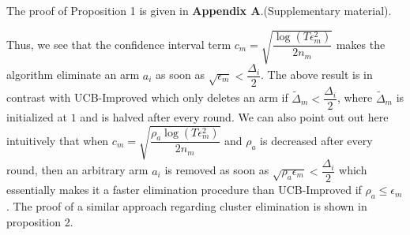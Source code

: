 	The proof of Proposition 1 is given in \textbf{Appendix A}.(Supplementary material).

\begin{remark}
\label{Result:Rem:10}	
	Thus, we see that the confidence interval term $c_{m}=\sqrt{\dfrac{\log (T\epsilon_{m}^{2})}{2 n_{m}}}$ makes the algorithm eliminate an arm $a_{i}$ as soon as $\sqrt{\epsilon_{m}}<\dfrac{\Delta_{i}}{2}$. The above result is in contrast with UCB-Improved which only deletes an arm if $\tilde{\Delta}_{m}<\dfrac{\Delta_{i}}{2}$, where $\tilde{\Delta}_{m}$ is initialized at $1$ and is halved after every round. We can also point out out here intuitively that when $c_{m}=\sqrt{\dfrac{\rho_{a}\log (T\epsilon_{m}^{2})}{2 n_{m}}}$ and $\rho_{a}$ is decreased after every round, then an arbitrary arm $a_{i}$ is removed as soon as  $\sqrt{\rho_{a}\epsilon_{m}}<\dfrac{\Delta_{i}}{2}$ which essentially makes it a faster elimination procedure than UCB-Improved if $\rho_{a}\leq \epsilon_{m}$. The proof of a similar approach regarding cluster elimination is shown in proposition 2.
\end{remark}

